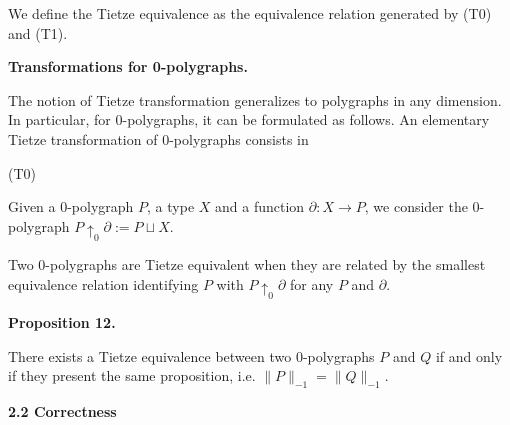 \documentclass[10pt,a4paper]{amsart}
\begin{document}
 
 
 
We define the Tietze equivalence as the equivalence relation generated by (T0) and (T1).\par
 
 
 
\par\medskip\noindent\textbf{Transformations for 0-polygraphs.}\par
 
 
The notion of Tietze transformation generalizes to polygraphs in any dimension. In particular, for 0-polygraphs, it can be formulated as follows. An elementary Tietze transformation of 0-polygraphs consists in\par
  (T0)  
 
Given a 0-polygraph $P$, a type $X$ and a function $\partial:X\to P$, we consider the 0-polygraph $P{\uparrow_{0}}\partial:=P\sqcup X$.\par
 
   
Two 0-polygraphs are Tietze equivalent when they are related by the smallest equivalence relation identifying $P$ with $P{\uparrow_{0}}\partial$ for any $P$ and $\partial$.\par
 
 
 
\par\medskip\noindent\textbf{Proposition 12.}\par
 
 
There exists a Tietze equivalence between two 0-polygraphs $P$ and $Q$ if and only if they present the same proposition, i.e. $\|P\|_{-1}=\|Q\|_{-1}$.\par
 
 
 
 
 
 
\par\medskip\noindent\textbf{2.2 Correctness}\par
 
\end{document}
